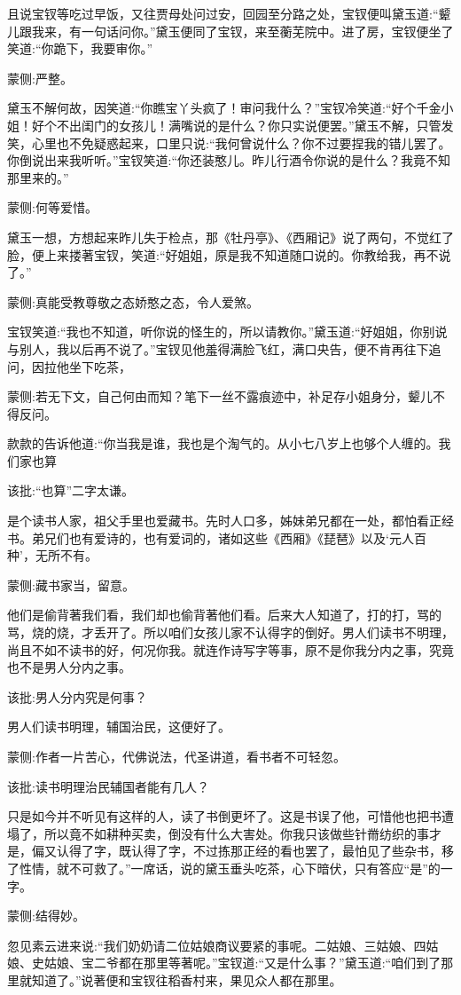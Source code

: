 \begin{parag}
    且说宝钗等吃过早饭，又往贾母处问过安，回园至分路之处，宝钗便叫黛玉道:“颦儿跟我来，有一句话问你。”黛玉便同了宝钗，来至蘅芜院中。进了房，宝钗便坐了笑道:“你跪下，我要审你。”\begin{note}蒙侧:严整。\end{note}黛玉不解何故，因笑道:“你瞧宝丫头疯了！审问我什么？”宝钗冷笑道:“好个千金小姐！好个不出闺门的女孩儿！满嘴说的是什么？你只实说便罢。”黛玉不解，只管发笑，心里也不免疑惑起来，口里只说:“我何曾说什么？你不过要捏我的错儿罢了。你倒说出来我听听。”宝钗笑道:“你还装憨儿。昨儿行酒令你说的是什么？我竟不知那里来的。”\begin{note}蒙侧:何等爱惜。\end{note}黛玉一想，方想起来昨儿失于检点，那《牡丹亭》、《西厢记》说了两句，不觉红了脸，便上来搂著宝钗，笑道:“好姐姐，原是我不知道随口说的。你教给我，再不说了。”\begin{note}蒙侧:真能受教尊敬之态娇憨之态，令人爱煞。\end{note}宝钗笑道:“我也不知道，听你说的怪生的，所以请教你。”黛玉道:“好姐姐，你别说与别人，我以后再不说了。”宝钗见他羞得满脸飞红，满口央告，便不肯再往下追问，因拉他坐下吃茶，\begin{note}蒙侧:若无下文，自己何由而知？笔下一丝不露痕迹中，补足存小姐身分，颦儿不得反问。\end{note}款款的告诉他道:“你当我是谁，我也是个淘气的。从小七八岁上也够个人缠的。我们家也算\begin{note}该批:“也算”二字太谦。\end{note}是个读书人家，祖父手里也爱藏书。先时人口多，姊妹弟兄都在一处，都怕看正经书。弟兄们也有爱诗的，也有爱词的，诸如这些《西厢》《琵琶》以及‘元人百种’，无所不有。\begin{note}蒙侧:藏书家当，留意。\end{note}他们是偷背著我们看，我们却也偷背著他们看。后来大人知道了，打的打，骂的骂，烧的烧，才丢开了。所以咱们女孩儿家不认得字的倒好。男人们读书不明理，尚且不如不读书的好，何况你我。就连作诗写字等事，原不是你我分内之事，究竟也不是男人分内之事。\begin{note}该批:男人分内究是何事？\end{note}男人们读书明理，辅国治民，这便好了。\begin{note}蒙侧:作者一片苦心，代佛说法，代圣讲道，看书者不可轻忽。\end{note}\begin{note}该批:读书明理治民辅国者能有几人？\end{note}只是如今并不听见有这样的人，读了书倒更坏了。这是书误了他，可惜他也把书遭塌了，所以竟不如耕种买卖，倒没有什么大害处。你我只该做些针黹纺织的事才是，偏又认得了字，既认得了字，不过拣那正经的看也罢了，最怕见了些杂书，移了性情，就不可救了。”一席话，说的黛玉垂头吃茶，心下暗伏，只有答应“是”的一字。\begin{note}蒙侧:结得妙。\end{note}忽见素云进来说:“我们奶奶请二位姑娘商议要紧的事呢。二姑娘、三姑娘、四姑娘、史姑娘、宝二爷都在那里等著呢。”宝钗道:“又是什么事？”黛玉道:“咱们到了那里就知道了。”说著便和宝钗往稻香村来，果见众人都在那里。
\end{parag}


